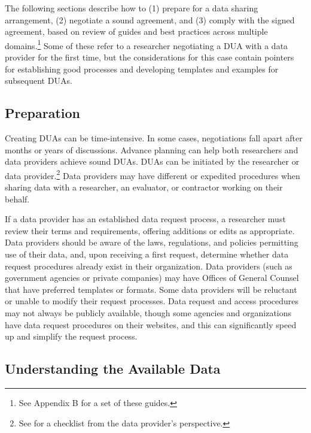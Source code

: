 The following sections describe how to (1) prepare for a data sharing arrangement, (2) negotiate a sound agreement, and (3) comply with the signed agreement, based on review of guides and best practices across multiple domains.\footnote{See Appendix B for a set of these guides.} Some of these refer to a researcher negotiating a DUA with a data provider for the first time, but the considerations for this case contain pointers for establishing good processes and developing templates and examples for subsequent DUAs.

\hypertarget{preparation}{%
\subsection{Preparation}\label{preparation}}

Creating DUAs can be time-intensive. In some cases, negotiations fall apart after months or years of discussions. Advance planning can help both researchers and data providers achieve sound DUAs. DUAs can be initiated by the researcher or data provider.\footnote{See \citet{yates2018} for a checklist from the data provider's perspective.} Data providers may have different or expedited procedures when sharing data with a researcher, an evaluator, or contractor working on their behalf.

If a data provider has an established data request process, a researcher must review their terms and requirements, offering additions or edits as appropriate. Data providers should be aware of the laws, regulations, and policies permitting use of their data, and, upon receiving a first request, determine whether data request procedures already exist in their organization. Data providers (such as government agencies or private companies) may have Offices of General Counsel that have preferred templates or formats. Some data providers will be reluctant or unable to modify their request processes. Data request and access procedures may not always be publicly available, though some agencies and organizations have data request procedures on their websites, and this can significantly speed up and simplify the request process.

\hypertarget{understanding-the-available-data}{%
\subsection{Understanding the Available Data}\label{understanding-the-available-data}}

